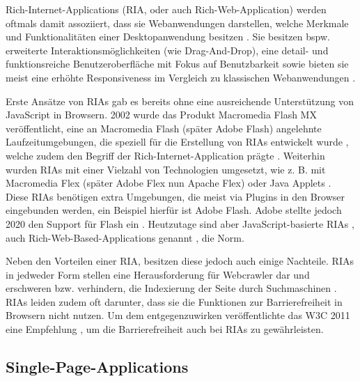 
Rich-Internet-Applications (RIA, oder auch Rich-Web-Application) werden oftmals damit assoziiert, dass sie Webanwendungen darstellen, welche Merkmale und Funktionalitäten einer Desktopanwendung besitzen \cite{TenYearsOfRIAs} \cite{NecessityOfMethodologiesToModelRIAs}. Sie besitzen bspw. erweiterte Interaktionsmöglichkeiten (wie Drag-And-Drop), eine detail- und funktionsreiche Benutzeroberfläche mit Fokus auf Benutzbarkeit sowie bieten sie meist eine erhöhte Responsiveness im Vergleich zu klassischen Webanwendungen \cite{TenYearsOfRIAs}.

Erste Ansätze von RIAs gab es bereits ohne eine ausreichende Unterstützung von JavaScript in Browsern. 2002 wurde das Produkt Macromedia Flash MX veröffentlicht, eine an Macromedia Flash (später Adobe Flash) angelehnte Laufzeitumgebungen, die speziell für die Erstellung von RIAs entwickelt wurde \cite{MacromediaFlashMXWhitePaper}, welche zudem den Begriff der Rich-Internet-Application prägte \cite{TenYearsOfRIAs}. Weiterhin wurden RIAs mit einer Vielzahl von Technologien umgesetzt, wie z. B. mit Macromedia Flex (später Adobe Flex nun Apache Flex) oder Java Applets \cite{NecessityOfMethodologiesToModelRIAs} \cite{RIAsTheNextStageOfApplicationDevelopment} \cite{RichInternetApplications} \cite{FinkIntroducingSPAs}. Diese RIAs benötigen extra Umgebungen, die meist via Plugins in den Browser eingebunden werden, ein Beispiel hierfür ist Adobe Flash. Adobe stellte jedoch 2020 den Support für Flash ein \cite{Netlytic}. Heutzutage sind aber JavaScript-basierte RIAs \cite{RIAsTheNextStageOfApplicationDevelopment}, auch Rich-Web-Based-Applications genannt \cite{RichWebBasedApplications} \cite{Netlytic}, die Norm. 

Neben den Vorteilen einer RIA, besitzen diese jedoch auch einige Nachteile. RIAs in jedweder Form stellen eine Herausforderung für Webcrawler dar und erschweren bzw. verhindern, die Indexierung der Seite durch Suchmaschinen \cite{CrawlingRIAs}. RIAs leiden zudem oft darunter, dass sie die Funktionen zur Barrierefreiheit in Browsern nicht nutzen. Um dem entgegenzuwirken veröffentlichte das W3C 2011 eine Empfehlung \cite{W3CAccessibleRIAs}, um die Barrierefreiheit auch bei RIAs zu gewährleisten.

\subsection{Single-Page-Applications}
\label{sec:single-page-applications}

